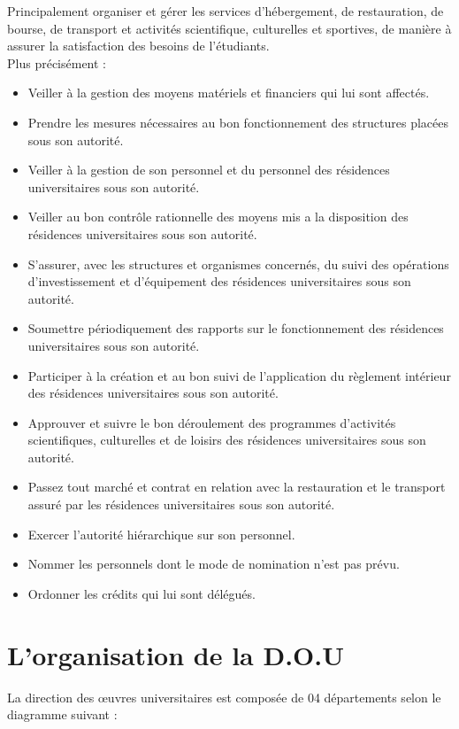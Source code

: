     Principalement organiser et gérer les services d'hébergement, de restauration, de bourse, de transport et activités scientifique, culturelles et sportives, de manière à assurer la satisfaction des besoins de l’étudiants.\\
    
    Plus précisément :
    
    \begin{itemize}\renewcommand{\labelitemi}{$\bullet$}
        \item Veiller à la gestion des moyens matériels et financiers qui lui sont affectés.
        \item Prendre les mesures nécessaires au bon fonctionnement des structures placées sous son autorité.
        \item Veiller à la gestion de son personnel et du personnel des résidences universitaires sous son autorité.
        \item Veiller au bon contrôle rationnelle des moyens mis a la disposition des résidences universitaires sous son autorité.
        \item S'assurer, avec les structures et organismes concernés, du suivi des opérations d'investissement et d'équipement des résidences universitaires sous son autorité.
        \item Soumettre périodiquement des rapports sur le fonctionnement des résidences universitaires sous son autorité.
        \item Participer à la création et au bon suivi de l'application du règlement intérieur des résidences universitaires sous son autorité.
        \item Approuver et suivre le bon déroulement des programmes d'activités scientifiques, culturelles et de loisirs des résidences universitaires sous son autorité.
        \item Passez tout marché et contrat en relation avec la restauration et le transport assuré par les résidences universitaires sous son autorité.
        \item Exercer l'autorité hiérarchique sur son personnel.
        \item Nommer les personnels dont le mode de nomination n'est pas prévu.
        \item Ordonner les crédits qui lui sont délégués.
    \end{itemize}

\section{L’organisation de la \acs{D.O.U} \cite{onou-arrete}}
    La direction des œuvres universitaires est composée de 04 départements selon le diagramme suivant :

